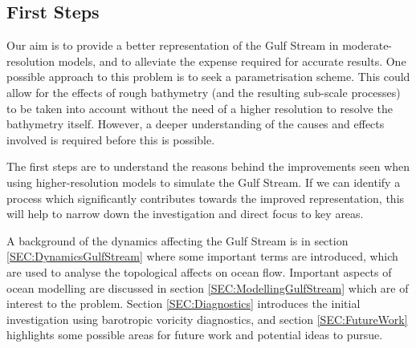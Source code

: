 \documentclass[..\report.tex]{subfiles}
\begin{document}
\subsection{First Steps}
\label{SSEC:FirstSteps}

Our aim is to provide a better representation of the Gulf Stream in moderate-resolution models, and to alleviate the expense required for accurate results.
One possible approach to this problem is to seek a parametrisation scheme. This could allow for the effects of rough bathymetry (and the resulting sub-scale processes) to be taken into account without the need of a higher resolution to resolve the bathymetry itself. However, a deeper understanding of the causes and effects involved is required before this is possible.\par
The first steps are to understand the reasons behind the improvements seen when using higher-resolution models to simulate the Gulf Stream.
If we can identify a process which significantly contributes towards the improved representation, this will help to narrow down the investigation and direct focus to key areas.\\

\par
A background of the dynamics affecting the Gulf Stream is in section \ref{SEC:DynamicsGulfStream} where some important terms are introduced, which are used to analyse the topological affects on ocean flow. Important aspects of ocean modelling are discussed in section \ref{SEC:ModellingGulfStream} which are of interest to the problem. Section \ref{SEC:Diagnostics} introduces the initial investigation using barotropic voricity diagnostics, and section \ref{SEC:FutureWork} highlights some possible areas for future work and potential ideas to pursue. %
\end{document}
